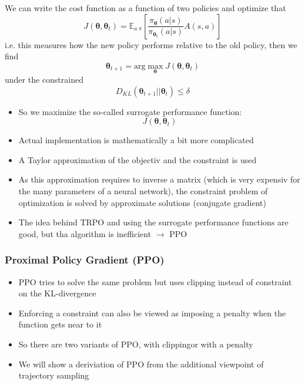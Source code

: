 We can write the cost function as a function of two policies and optimize that
\[
J(\boldsymbol{\theta},\boldsymbol{\theta}_t) = \mathbb{E}_{a~\pi}\left[\frac{\pi_{\boldsymbol{\theta}}(a|s)}{\pi_{\boldsymbol{\theta}_t}(a|s)}A(s,a)\right]
\]
i.e. this measures how the new policy performs relative to the old policy, then we find 
\[
    \boldsymbol{\theta}_{t+1} = \text{arg}\max_{\boldsymbol{\theta}} J(\boldsymbol{\theta},\boldsymbol{\theta}_t)
\]
under the constrained
\[
D_{KL}(\boldsymbol{\theta}_{t+1}||\boldsymbol{\theta}_t) \le \delta
\]
\begin{itemize}
    \item So we maximize the so-called surrogate performance function:
    \[
    J(\boldsymbol{\theta},\boldsymbol{\theta}_t)
    \]
    \item Actual implementation is mathematically a bit more complicated
    \item A Taylor approximation of the objectiv and the constraint is used
    \item As this approximation requires to inverse a matrix (which is very expensiv for the many parameters of a neural network), the constraint problem of optimization is solved by approximate solutions (conjugate gradient)
    \item The idea behind TRPO and using the surrogate performance functions are good, but tha algorithm is inefficient \(\rightarrow\) PPO
\end{itemize}
\subsubsection{Proximal Policy Gradient (PPO)}
\begin{itemize}
    \item PPO tries to solve the same problem but uses clipping instead of constraint on the KL-divergence
    \item Enforcing a constraint can also be viewed as imposing a penalty when the function gets near to it
    \item So there are two variants of PPO, with clippingor with a penalty
    \item We will show a deriviation of PPO from the additional viewpoint of trajectory sampling
\end{itemize}
